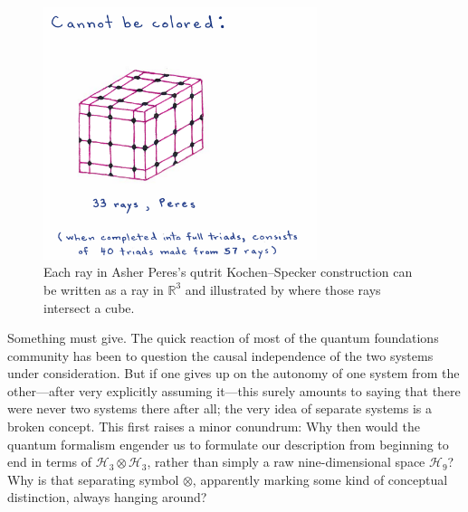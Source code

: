 \documentclass[aps,pra,superscriptaddress,10pt,tightenlines,twocolumn,nofootinbib]{revtex4}
\begin{document}
\begin{figure}[ht]
\begin{center}
\includegraphics[width=8cm]{peres.png}
\end{center}
\caption{\label{fig:peres} Each ray in Asher Peres's qutrit Kochen--Specker construction can be written as a ray in $\mathbb{R}^3$ and illustrated by where those rays intersect a cube.}
\end{figure}

Something must give.  The quick reaction of most of the quantum foundations community has been to question the causal independence of the two systems under consideration.  But if one gives up on the autonomy of one system from the other---after very explicitly assuming it---this surely amounts to saying that there were never two systems there after all; the very idea of separate systems is a broken concept.  This first raises a minor conundrum:  Why then would the quantum formalism engender us to formulate our description from beginning to end in terms of ${\mathcal H}_3\otimes{\mathcal H}_3$, rather than simply a raw nine-dimensional space ${\mathcal H}_{9}$?  Why is that separating symbol $\otimes$, apparently marking some kind of conceptual distinction, always hanging around?
\end{document}
